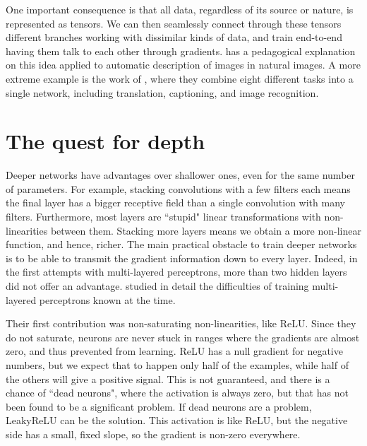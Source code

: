 One important consequence is that all data, regardless of its source or nature, is represented as tensors.
We can then seamlessly connect through these tensors different branches working with dissimilar kinds of data, and train end-to-end having them talk to each other through gradients.
\citet{tensors_and_gradients} has a pedagogical explanation on this idea applied to automatic description of images in natural images.
A more extreme example is the work of \citet{one_rule_all}, where they combine eight different tasks into a single network, including translation, captioning, and image recognition.


\section{The quest for depth}\label{sec:depth}
Deeper networks have advantages over shallower ones, even for the same number of parameters.
For example, stacking convolutions with a few filters each means the final layer has a bigger receptive field than a single convolution with many filters.
Furthermore, most layers are ``stupid" linear transformations with non-linearities between them.
Stacking more layers means we obtain a more non-linear function, and hence, richer.
The main practical obstacle to train deeper networks is to be able to transmit the gradient information down to every layer.
Indeed, in the first attempts with multi-layered perceptrons, more than two hidden layers did not offer an advantage.
\citet{glorot} studied in detail the difficulties of training multi-layered perceptrons known at the time.

Their first contribution  was non-saturating non-linearities, like ReLU.
Since they do not saturate, neurons are never stuck in ranges where the gradients are almost zero, and thus prevented from learning.
ReLU has a null gradient for negative numbers, but we expect that to happen only half of the examples, while half of the others will give a positive signal.
This is not guaranteed, and there is a chance of ``dead neurons", where the activation is always zero, but that has not been found to be a significant problem.
If dead neurons are a problem, LeakyReLU  %
can be the solution.
This activation is like ReLU, but the negative side has a small, fixed slope, so the gradient is non-zero everywhere.


